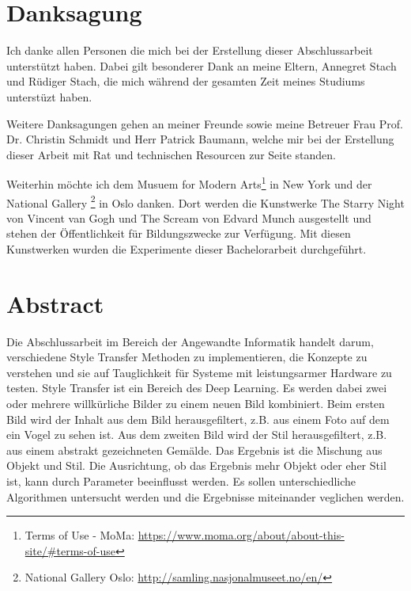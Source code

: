\chapter*{Danksagung}

Ich danke allen Personen die mich bei der Erstellung dieser Abschlussarbeit unterstützt haben. Dabei gilt besonderer Dank an meine Eltern, Annegret Stach und Rüdiger Stach, die mich während der gesamten Zeit meines Studiums unterstüzt haben.

Weitere Danksagungen gehen an meiner Freunde sowie meine Betreuer Frau Prof. Dr. Christin Schmidt und Herr Patrick Baumann, welche mir bei der Erstellung dieser Arbeit mit Rat und technischen Resourcen zur Seite standen.

Weiterhin möchte ich dem Musuem for Modern Arts\footnote{Terms of Use - MoMa: \url{https://www.moma.org/about/about-this-site/\#terms-of-use}} in New York und der National Gallery \footnote{National Gallery Oslo: \url{http://samling.nasjonalmuseet.no/en/}} in Oslo danken. Dort werden die Kunstwerke The Starry Night von Vincent van Gogh \cite{the_starry_night_img} und The Scream von Edvard Munch \cite{the_scream_img} ausgestellt und stehen der Öffentlichkeit für Bildungszwecke zur Verfügung. Mit diesen Kunstwerken wurden die Experimente dieser Bachelorarbeit durchgeführt.

\pagebreak

\chapter*{Abstract}


Die Abschlussarbeit im Bereich der Angewandte Informatik handelt darum, verschiedene Style Transfer Methoden zu implementieren, die Konzepte zu verstehen und sie auf Tauglichkeit für Systeme mit leistungsarmer Hardware zu testen. Style Transfer ist ein Bereich des Deep Learning. Es werden dabei zwei oder mehrere willkürliche Bilder zu einem neuen Bild kombiniert. Beim ersten Bild wird der Inhalt aus dem Bild herausgefiltert, z.B. aus einem Foto auf dem ein Vogel zu sehen ist. Aus dem zweiten Bild wird der Stil herausgefiltert, z.B. aus einem abstrakt gezeichneten Gemälde. Das Ergebnis ist die Mischung aus Objekt und Stil. Die Ausrichtung, ob das Ergebnis mehr Objekt oder eher Stil ist, kann durch Parameter beeinflusst werden. Es sollen unterschiedliche Algorithmen untersucht werden und die Ergebnisse miteinander veglichen werden.